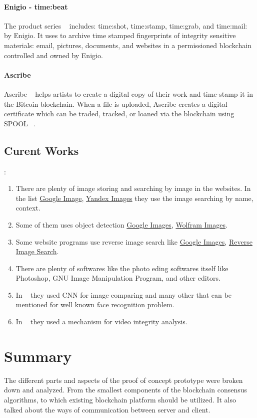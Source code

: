 \paragraph{Enigio - time:beat}
The product series  ~\cite{asa_enigio} includes: time:shot, time:stamp, time:grab, and time:mail: by Enigio. It uses to archive time stamped fingerprints of integrity sensitive materials: email, pictures, documents, and websites in a permissioned blockchain controlled and owned by Enigio.
\paragraph{Ascribe}
Ascribe ~\cite{h_intellect} helps artists to create a digital copy of their work and time-stamp it in the Bitcoin blockchain. When a file is uploaded, Ascribe creates a digital certificate which can be traded, tracked, or loaned via the blockchain using SPOOL ~\cite{dt_spool}.

\subsection{Curent Works}:
\begin{enumerate}
\item There are plenty of image storing and searching by image in the websites. In the list \href{https://images.google.com/}{Google Image}, \href{https://www.yandex.com/images/}{Yandex Images} they use the image searching by name, context.
\item Some of them uses object detection \href{https://images.google.com/}{Google Images}, \href{https://www.imageidentify.com/}{Wolfram Images}.
\item Some website programs use reverse image search like \href{https://images.google.com/}{Google Images}, \href{https://tineye.com/}{Reverse Image Search}.
\item There are plenty of softwares like the photo eding softwares itself like Photoshop, GNU Image Manipulation Program, and other editors.
\item In ~\cite{img_cnn} they used CNN for image comparing and many other that can be mentioned for well known face recognition problem.
\item In ~\cite{adam_fabian} they used a mechanism for video integrity analysis.
\end{enumerate}

\section{Summary}
\label{sec:summary}
The different parts and aspects of the proof of concept prototype were broken down and analyzed. From the smallest components of the blockchain consensus algorithms, to which existing blockchain platform should be utilized. It also talked about the ways of communication between server and client.
